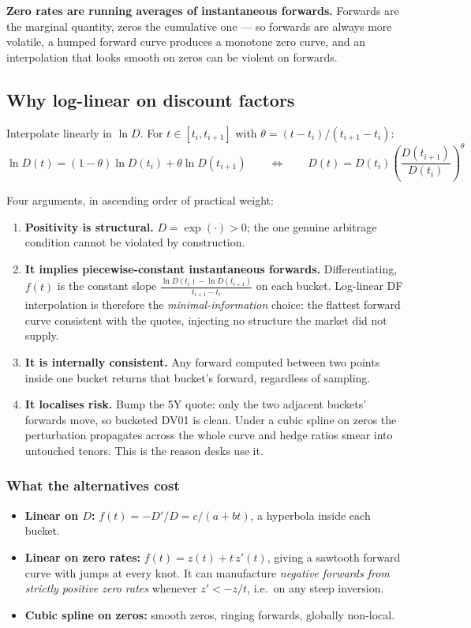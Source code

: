 \documentclass[11pt,a4paper]{article}
\newcommand{\keypoint}[1]{%
  \par\vspace{0.4em}\noindent
  \colorbox{codebg}{\parbox{\dimexpr\linewidth-2\fboxsep}{\small #1}}%
  \par\vspace{0.5em}}
\begin{document}
\keypoint{\textbf{Zero rates are running averages of instantaneous forwards.} Forwards are
the marginal quantity, zeros the cumulative one --- so forwards are always more volatile, a
humped forward curve produces a monotone zero curve, and an interpolation that looks smooth
on zeros can be violent on forwards.}

\subsection{Why log-linear on discount factors}

Interpolate linearly in $\ln D$. For $t \in [t_i, t_{i+1}]$ with
$\theta = (t - t_i)/(t_{i+1}-t_i)$:
\[
\ln D(t) = (1-\theta)\ln D(t_i) + \theta \ln D(t_{i+1})
\qquad\Longleftrightarrow\qquad
D(t) = D(t_i)\left(\frac{D(t_{i+1})}{D(t_i)}\right)^{\theta}
\]

Four arguments, in ascending order of practical weight:

\begin{enumerate}[leftmargin=1.4em,itemsep=0.25em]
\item \textbf{Positivity is structural.} $D = \exp(\cdot) > 0$; the one genuine arbitrage
condition cannot be violated by construction.
\item \textbf{It implies piecewise-constant instantaneous forwards.} Differentiating,
$f(t)$ is the constant slope $\frac{\ln D(t_i) - \ln D(t_{i+1})}{t_{i+1}-t_i}$ on each
bucket. Log-linear DF interpolation is therefore the \emph{minimal-information} choice: the
flattest forward curve consistent with the quotes, injecting no structure the market did not
supply.
\item \textbf{It is internally consistent.} Any forward computed between two points inside
one bucket returns that bucket's forward, regardless of sampling.
\item \textbf{It localises risk.} Bump the 5Y quote: only the two adjacent buckets' forwards
move, so bucketed DV01 is clean. Under a cubic spline on zeros the perturbation propagates
across the whole curve and hedge ratios smear into untouched tenors. This is the reason
desks use it.
\end{enumerate}

\subsubsection*{What the alternatives cost}

\begin{itemize}[leftmargin=1.4em,itemsep=0.15em]
\item \textbf{Linear on $D$:} $f(t) = -D'/D = c/(a+bt)$, a hyperbola inside each bucket.
\item \textbf{Linear on zero rates:} $f(t) = z(t) + t\,z'(t)$, giving a sawtooth forward
curve with jumps at every knot. It can manufacture \emph{negative forwards from strictly
positive zero rates} whenever $z' < -z/t$, i.e.\ on any steep inversion.
\item \textbf{Cubic spline on zeros:} smooth zeros, ringing forwards, globally non-local.
\end{itemize}
\end{document}
